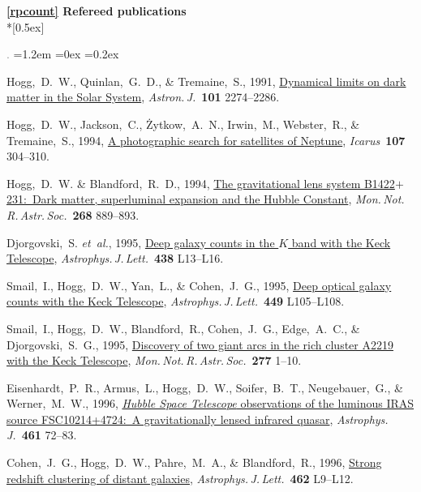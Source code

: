\documentclass[10pt,letterpaper]{article}
\newcommand{\foreign}[1]{\textsl{#1}}
\newcommand{\etal}{\foreign{et~al.}}
\newcommand{\project}[1]{\textsl{#1}}
\newcommand{\doi}[2]{\href{http://dx.doi.org/#1}{{#2}}}
\newcommand{\deemph}[1]{\textcolor{grey}{\footnotesize{#1}}}
\newcommand{\pubnumber}[1]{\deemph{{#1}.}}
\newcommand{\hoggheading}[1]{\addvspace{1.5ex}\pagebreak[3]%
    \par\textbf{#1}\nopagebreak%
    \afterpage{\markboth{David W. Hogg, curriculum vitae continued: \textbf{#1}}{}}%
    \nopagebreak\\*[0.5ex]\nopagebreak}%
\newcounter{refpubnum}
\newcommand{\hogglist}{%
    \rightmargin=0in
    \leftmargin=1.2em
    \topsep=0ex
    \partopsep=0pt
    \itemsep=0.2ex
    \parsep=0pt
    \itemindent=-1.0\leftmargin
    \listparindent=0.0\leftmargin
    \settowidth{\labelsep}{~}
    \usecounter{refpubnum}
  }
\begin{document}

\hypersetup{linkcolor=black}%
\hoggheading{\ref{rpcount} Refereed publications}%
\hypersetup{linkcolor=grey}%
\begin{list}{\pubnumber{\therefpubnum}}{\hogglist}
\item
Hogg,~D.~W., Quinlan,~G.~D., \& Tremaine,~S., 1991,
\doi{10.1086/115849}{Dynamical limits on dark matter in the Solar System},
\textit{Astron.\,J.}\ \textbf{101} 2274--2286.
\item
Hogg,~D.~W., Jackson,~C., \.Zytkow,~A.~N., Irwin,~M., Webster,~R., \& Tremaine,~S., 1994,
\doi{10.1006/icar.1994.1025}{A photographic search for satellites of Neptune},
\textit{Icarus}\ \textbf{107} 304--310.
\item
Hogg,~D.~W. \& Blandford,~R.~D., 1994,
\doi{10.1093/mnras/268.4.889}{The gravitational lens system B1422$+$231:\ Dark matter, superluminal expansion and the Hubble Constant},
\textit{Mon.\,Not.\,R.\,Astr.\,Soc.}\ \textbf{268} 889--893.
\item
Djorgovski,~S. \etal, 1995,
\doi{10.1086/187703}{Deep galaxy counts in the $K$ band with the Keck Telescope},
\textit{Astrophys.\,J.\,Lett.}\ \textbf{438} L13--L16.
\item
Smail,~I., Hogg,~D.~W., Yan,~L., \& Cohen,~J.~G., 1995,
\doi{10.1086/309647}{Deep optical galaxy counts with the Keck Telescope},
\textit{Astrophys.\,J.\,Lett.}\ \textbf{449} L105--L108.
\item
Smail,~I., Hogg,~D.~W., Blandford,~R., Cohen,~J.~G., Edge,~A.~C., \& Djorgovski,~S.~G., 1995,
\doi{10.1093/mnras/277.1.1}{Discovery of two giant arcs in the rich cluster A2219 with the Keck Telescope},
\textit{Mon.\,Not.\,R.\,Astr.\,Soc.}\ \textbf{277} 1--10.
\item
Eisenhardt,~P.~R., Armus,~L., Hogg,~D.~W., Soifer,~B.~T., Neugebauer,~G., \& Werner,~M.~W., 1996,
\doi{10.1086/177038}{\project{Hubble Space Telescope} observations of the luminous IRAS source FSC10214+4724:\ A gravitationally lensed infrared quasar},
\textit{Astrophys.\,J.}\ \textbf{461} 72--83.
\item
Cohen,~J.~G., Hogg,~D.~W., Pahre,~M.~A., \& Blandford,~R., 1996,
\doi{10.1086/310020}{Strong redshift clustering of distant galaxies},
\textit{Astrophys.\,J.\,Lett.}\ \textbf{462} L9--L12.

\end{list}
\end{document}
